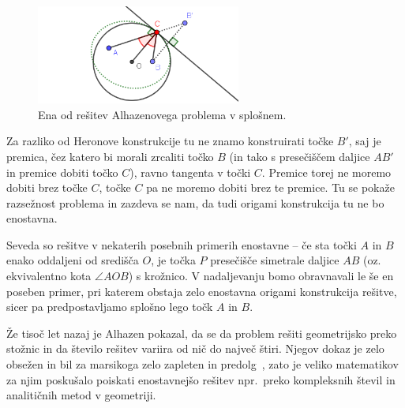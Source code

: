 \begin{figure}[h]
    \centering
    \includegraphics[width=0.6\textwidth]{images/alhazen/alhazen1.png}
    \caption[Alhazenov problem]{Ena od rešitev Alhazenovega problema v splošnem.}
    \label{fig:alhazen1}
\end{figure}

Za razliko od Heronove konstrukcije tu ne znamo konstruirati točke $B'$, saj je premica, čez katero bi morali zrcaliti točko $B$ (in tako s presečiščem daljice $AB'$ in premice dobiti točko $C$), ravno tangenta v točki $C$. Premice torej ne moremo dobiti brez točke $C$, točke $C$ pa ne moremo dobiti brez te premice. Tu se pokaže razsežnost problema in zazdeva se nam, da tudi origami konstrukcija tu ne bo enostavna.

Seveda so rešitve v nekaterih posebnih primerih enostavne -- če sta točki $A$ in $B$ enako oddaljeni od središča $O$, je točka $P$ presečišče simetrale daljice $AB$ (oz. ekvivalentno kota $\angle AOB$) s krožnico. V nadaljevanju bomo obravnavali le še en poseben primer, pri katerem obstaja zelo enostavna origami konstrukcija rešitve, sicer pa predpostavljamo splošno lego točk $A$ in $B$.


Že tisoč let nazaj je Alhazen pokazal, da se da problem rešiti geometrijsko preko stožnic in da število rešitev variira od nič do največ štiri. Njegov dokaz je zelo obsežen in bil za marsikoga zelo zapleten in predolg~\cite{wilk2015}, zato je veliko matematikov za njim poskušalo poiskati enostavnejšo rešitev npr.\ preko kompleksnih števil in analitičnih metod v geometriji.

